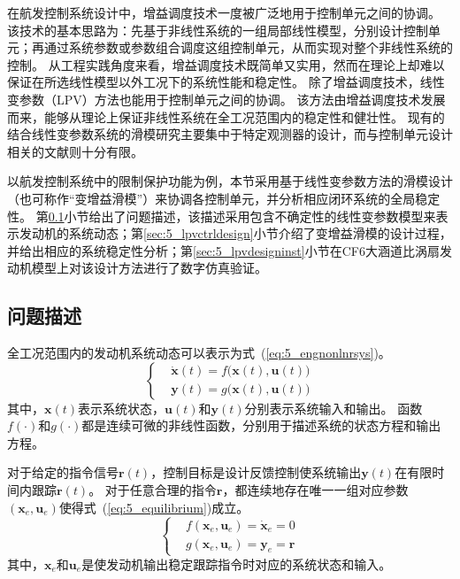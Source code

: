 \documentclass{article}
\begin{document}
在航发控制系统设计中，增益调度技术\cite{Rugh2000Research,Leith2000Survey,Pakmehr2014Gain}一度被广泛地用于控制单元之间的协调。
该技术的基本思路为：先基于非线性系统的一组局部线性模型，分别设计控制单元；再通过系统参数或参数组合调度这组控制单元，从而实现对整个非线性系统的控制。
从工程实践角度来看，增益调度技术既简单又实用，然而在理论上却难以保证在所选线性模型以外工况下的系统性能和稳定性\cite{Shamma1991Gain}。
除了增益调度技术，线性变参数（LPV）方法\cite{SHAMMA1993Gain,Kajiwara1999LPV,Lu2006LPV}也能用于控制单元之间的协调。
该方法由增益调度技术发展而来，能够从理论上保证非线性系统在全工况范围内的稳定性和健壮性。
现有的结合线性变参数系统的滑模研究主要集中于特定观测器的设计\cite{Chandra2017Fault,Hamdi2019Fault,Chen2018Sensor}，而与控制单元设计相关的文献则十分有限。

以航发控制系统中的限制保护功能为例，本节采用基于线性变参数方法的滑模设计（也可称作“变增益滑模”）来协调各控制单元，并分析相应闭环系统的全局稳定性。
第\ref{sec:5_lpvprobform}小节给出了问题描述，该描述采用包含不确定性的线性变参数模型来表示发动机的系统动态；第\ref{sec:5_lpvctrldesign}小节介绍了变增益滑模的设计过程，并给出相应的系统稳定性分析；第\ref{sec:5_lpvdesigninst}小节在CF6大涵道比涡扇发动机模型上对该设计方法进行了数字仿真验证。

\subsection{问题描述}
\label{sec:5_lpvprobform}

全工况范围内的发动机系统动态可以表示为式~(\ref{eq:5_engnonlnrsys})。
\begin{equation}
\left \{
\begin{aligned}
   &\dot{\bm{x}}(t)=f\big ( \bm{x}(t), \bm{u}(t) \big )\\
   &\bm{y}(t)=g\big ( \bm{x}(t), \bm{u}(t) \big )
\end{aligned}
\right .
\label{eq:5_engnonlnrsys}
\end{equation}
其中，$\bm{x}(t)$表示系统状态，$\bm{u}(t)$和$\bm{y}(t)$分别表示系统输入和输出。
函数$f(\cdot )$和$g(\cdot)$都是连续可微的非线性函数，分别用于描述系统的状态方程和输出方程。

对于给定的指令信号$\bm{r}(t)$，控制目标是设计反馈控制使系统输出$\bm{y}(t)$在有限时间内跟踪$\bm{r}(t)$。
对于任意合理的指令$\bm{r}$，都连续地存在唯一一组对应参数$(\bm{x}_e,\bm{u}_e)$使得式~(\ref{eq:5_equilibrium})成立。
\begin{equation}
\left \{
\begin{aligned}
   &f(\bm{x}_e,\bm{u}_e)=\dot{\bm{x}}_e=0\\
   &g(\bm{x}_e,\bm{u}_e)=\bm{y}_e=\bm{r}
\end{aligned}
\right .
\label{eq:5_equilibrium}
\end{equation}
其中，$\bm{x}_e$和$\bm{u}_e$是使发动机输出稳定跟踪指令时对应的系统状态和输入\cite{Pakmehr2014Gain}。
\end{document}
